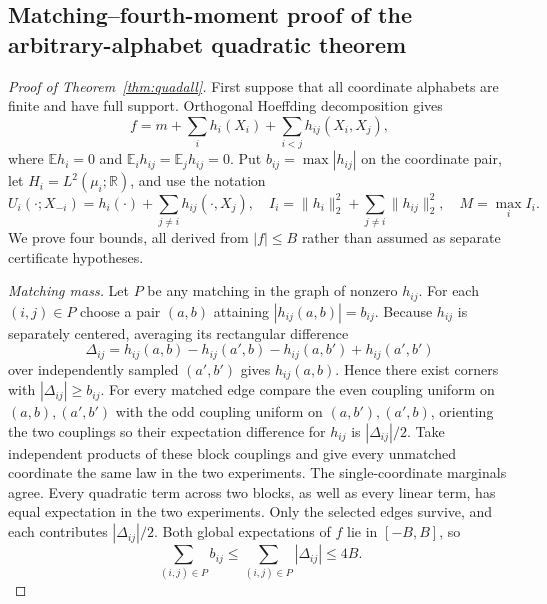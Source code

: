 \documentclass[11pt]{article}
\numberwithin{equation}{section}
\theoremstyle{remark}
\newcommand{\E}{\mathbb E}
\newcommand{\R}{\mathbb R}
\begin{document}
\subsection{Matching--fourth-moment proof of the arbitrary-alphabet quadratic theorem}
\begin{proof}[Proof of Theorem~\ref{thm:quadall}]
First suppose that all coordinate alphabets are finite and have full support. Orthogonal Hoeffding decomposition gives
\[
 f=m+\sum_i h_i(X_i)+\sum_{i<j}h_{ij}(X_i,X_j),
\]
where $\E h_i=0$ and $\E_i h_{ij}=\E_j h_{ij}=0$. Put $b_{ij}=\max|h_{ij}|$ on the coordinate pair, let $H_i=L^2(\mu_i;\R)$, and use the notation
\[
 U_i(\cdot;X_{-i})=h_i(\cdot)+\sum_{j\ne i}h_{ij}(\cdot,X_j),\quad
 I_i=\|h_i\|_2^2+\sum_{j\ne i}\|h_{ij}\|_2^2,\quad M=\max_i I_i.
\]
We prove four bounds, all derived from $|f|\le B$ rather than assumed as separate certificate hypotheses.

\emph{Matching mass.} Let $P$ be any matching in the graph of nonzero $h_{ij}$. For each $(i,j)\in P$ choose a pair $(a,b)$ attaining $|h_{ij}(a,b)|=b_{ij}$. Because $h_{ij}$ is separately centered, averaging its rectangular difference
\[
 \Delta_{ij}=h_{ij}(a,b)-h_{ij}(a',b)-h_{ij}(a,b')+h_{ij}(a',b')
\]
over independently sampled $(a',b')$ gives $h_{ij}(a,b)$. Hence there exist corners with $|\Delta_{ij}|\ge b_{ij}$. For every matched edge compare the even coupling uniform on $(a,b),(a',b')$ with the odd coupling uniform on $(a,b'),(a',b)$, orienting the two couplings so their expectation difference for $h_{ij}$ is $|\Delta_{ij}|/2$. Take independent products of these block couplings and give every unmatched coordinate the same law in the two experiments. The single-coordinate marginals agree. Every quadratic term across two blocks, as well as every linear term, has equal expectation in the two experiments. Only the selected edges survive, and each contributes $|\Delta_{ij}|/2$. Both global expectations of $f$ lie in $[-B,B]$, so
\begin{equation}\label{eq:qmatching}
 \sum_{(i,j)\in P}b_{ij}\le\sum_{(i,j)\in P}|\Delta_{ij}|\le4B.
\end{equation}


\end{proof}
\end{document}
